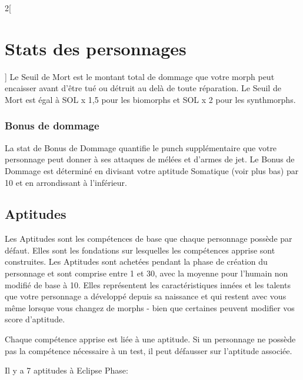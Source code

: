 \documentclass[a4paper,9pt]{article}
\begin{document}
\begin{multicols}{2}[\section{Stats des personnages} \label{sec:character-stats}]
Le Seuil de Mort est le montant total de dommage que votre morph peut encaisser
avant d'être tué ou détruit au delà de toute réparation. Le Seuil de Mort est
égal à SOL x 1,5 pour les biomorphs et SOL x 2 pour les synthmorphs. 

\subsubsection{Bonus de dommage} \label{sec:damage-bonus} 

La stat de Bonus de Dommage quantifie le punch supplémentaire que votre
personnage peut donner à ses attaques de mélées et d'armes de jet. Le Bonus de
Dommage est déterminé en divisant votre aptitude Somatique (voir plus bas) par
10 et en arrondissant à l'inférieur. 

\subsection{Aptitudes} \label{sec:aptitudes} 

Les Aptitudes sont les compétences de base que chaque personnage possède par
défaut. Elles sont les fondations sur lesquelles les compétences apprise sont
construites. Les Aptitudes sont achetées pendant la phase de création du
personnage et sont comprise entre 1 et 30, avec la moyenne pour l'humain non
modifié de base à 10. Elles représentent les caractéristiques innées et les
talents que votre personnage a développé depuis sa naissance et qui restent
avec vous même lorsque vous changez de morphs - bien que certaines peuvent
modifier vos score d'aptitude. 

Chaque compétence apprise est liée à une aptitude. Si un personnage ne possède
pas la compétence nécessaire à un test, il peut défausser sur l'aptitude
associée. 

Il y a 7 aptitudes à Eclipse Phase: 


\end{multicols}
\end{document}
